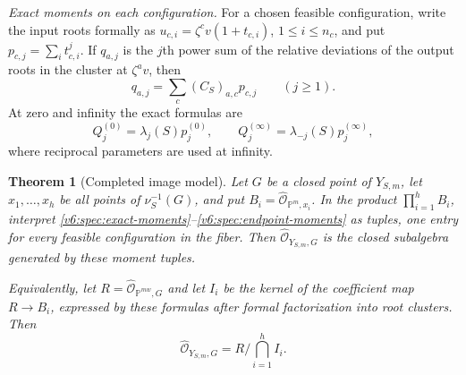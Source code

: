 \documentclass[10pt,fleqn]{article}
\numberwithin{equation}{section}
\newtheorem{theorem}{Theorem}[section]
\newcommand{\PP}{\mathbb P}
\begin{document}
\emph{Exact moments on each configuration.}
For a chosen feasible configuration, write the input roots formally as
$u_{c,i}=\zeta^cv(1+t_{c,i})$, $1\le i\le n_c$, and put
$p_{c,j}=\sum_i t_{c,i}^j$.  If $q_{a,j}$ is the $j$th power sum of the
relative deviations of the output roots in the cluster at $\zeta^av$, then
\begin{equation}\label{v6:spec:exact-moments}
 q_{a,j}=\sum_c(C_S)_{a,c}p_{c,j}\qquad(j\ge1).
\end{equation}
At zero and infinity the exact formulas are
\begin{equation}\label{v6:spec:endpoint-moments}
 Q_j^{(0)}=\lambda_j(S)p_j^{(0)},\qquad
 Q_j^{(\infty)}=\lambda_{-j}(S)p_j^{(\infty)},
\end{equation}
where reciprocal parameters are used at infinity.

\begin{theorem}[Completed image model]\label{v6:spec:completed-model}
Let $G$ be a closed point of $Y_{S,m}$, let $x_1,\ldots,x_h$ be all
points of $\nu_S^{-1}(G)$, and put
$B_i=\widehat{\mathcal O}_{\PP^m,x_i}$.  In the product
$\prod_{i=1}^h B_i$, interpret
\eqref{v6:spec:exact-moments}--\eqref{v6:spec:endpoint-moments} as tuples,
one entry for every feasible configuration in the fiber.  Then
$\widehat{\mathcal O}_{Y_{S,m},G}$ is the closed subalgebra generated by
these moment tuples.

Equivalently, let $R=\widehat{\mathcal O}_{\PP^{mw},G}$ and let $I_i$ be
the kernel of the coefficient map $R\longrightarrow B_i$, expressed by
these formulas after formal factorization into root clusters.  Then
\begin{equation}\label{v6:spec:kernel-intersection}
 \widehat{\mathcal O}_{Y_{S,m},G}=R\big/\bigcap_{i=1}^h I_i.
\end{equation}
\end{theorem}
\end{document}
